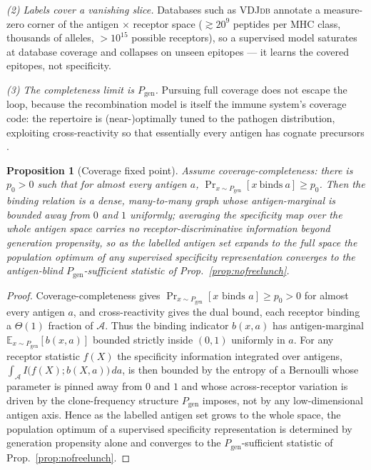 \documentclass[11pt]{article}
\theoremstyle{oldplain}
\newtheorem{proposition}{Proposition}
\theoremstyle{oldrem}
\newcommand{\Pgen}{P_{\mathrm{gen}}}
\newcommand{\E}{\mathds{E}}
\begin{document}
\emph{(2) Labels cover a vanishing slice.} Databases such as {\scshape VDJdb} \cite{Goncharov2022} annotate
a measure-zero corner of the antigen$\,\times\,$receptor space ($\gtrsim 20^{9}$ peptides per {\scshape MHC}
class, thousands of alleles, $>10^{15}$ possible receptors), so a supervised model saturates at database
coverage and collapses on unseen epitopes --- it learns the covered epitopes, not specificity.

\emph{(3) The completeness limit is $\Pgen$.} Pursuing full coverage does not escape the loop, because the
recombination model is itself the immune system's coverage code: the repertoire is (near-)optimally tuned to
the pathogen distribution, exploiting cross-reactivity so that essentially every antigen has cognate
precursors \cite{Mayer2015,Murugan2012}.

\begin{proposition}[Coverage fixed point]\label{prop:coverage}
Assume coverage-completeness: there is $p_0>0$ such that for almost every antigen $a$,
$\Pr_{x\sim\Pgen}[x\ \text{binds}\ a]\ge p_0$. Then the binding relation is a dense, many-to-many graph
whose antigen-marginal is bounded away from $0$ and $1$ uniformly; averaging the specificity map over the
whole antigen space carries no receptor-discriminative information beyond generation propensity, so as the
labelled antigen set expands to the full space the population optimum of any supervised specificity
representation converges to the antigen-blind $\Pgen$-sufficient statistic of Prop.~\ref{prop:nofreelunch}.
\end{proposition}
\begin{proof}
Coverage-completeness gives $\Pr_{x\sim\Pgen}[x\text{ binds }a]\ge p_0>0$ for almost every antigen $a$, and
cross-reactivity gives the dual bound, each receptor binding a $\Theta(1)$ fraction of $\mathcal A$. Thus the
binding indicator $b(x,a)$ has antigen-marginal $\E_{x\sim\Pgen}[b(x,a)]$ bounded strictly inside $(0,1)$
uniformly in $a$. For any receptor statistic $f(X)$ the specificity information integrated over antigens,
$\int_{\mathcal A} I\big(f(X);b(X,a)\big)\,da$, is then bounded by the entropy of a Bernoulli whose parameter
is pinned away from $0$ and $1$ and whose across-receptor variation is driven by the clone-frequency structure
$\Pgen$ imposes, not by any low-dimensional antigen axis. Hence as the labelled antigen set grows to the whole
space, the population optimum of a supervised specificity representation is determined by generation
propensity alone and converges to the $\Pgen$-sufficient statistic of Prop.~\ref{prop:nofreelunch}.
\end{proof}
\end{document}
